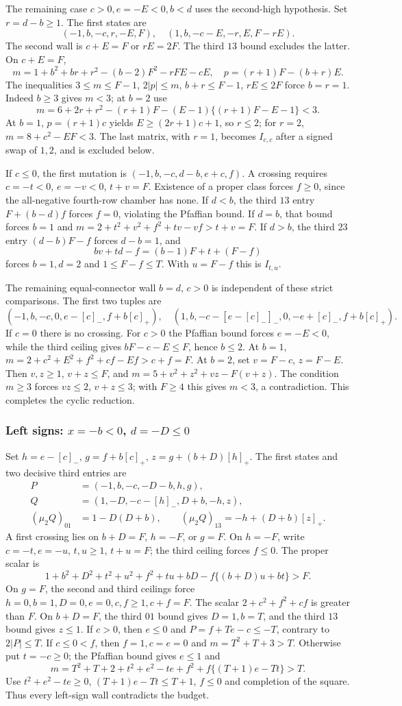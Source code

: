 The remaining case $c>0,e=-E<0,b<d$ uses the second-high hypothesis. Set $r=d-b\ge1$. The first states are
\[
 (-1,b,-c,r,-E,F),\quad(1,b,-c-E,-r,E,F-rE).
\]
The second wall is $c+E=F$ or $rE=2F$. The third $13$ bound excludes the latter. On $c+E=F$,
\[
 m=1+b^2+br+r^2-(b-2)F^2-rFE-cE,\quad p=(r+1)F-(b+r)E.
\]
The inequalities $3\le m\le F-1$, $2|p|\le m$, $b+r\le F-1$, $rE\le2F$ force $b=r=1$. Indeed $b\ge3$ gives $m<3$; at $b=2$ use
\[
 m=6+2r+r^2-(r+1)F-(E-1)\{(r+1)F-E-1\}<3.
\]
At $b=1$, $p=(r+1)c$ yields $E\ge(2r+1)c+1$, so $r\le2$; for $r=2$, $m=8+c^2-EF<3$. The last matrix, with $r=1$, becomes $I_{c,c}$ after a signed swap of $1,2$, and is excluded below.

If $c\le0$, the first mutation is $(-1,b,-c,d-b,e+c,f)$. A crossing requires $c=-t<0$, $e=-v<0$, $t+v=F$. Existence of a proper class forces $f\ge0$, since the all-negative fourth-row chamber has none. If $d<b$, the third $13$ entry $F+(b-d)f$ forces $f=0$, violating the Pfaffian bound. If $d=b$, that bound forces $b=1$ and
$m=2+t^2+v^2+f^2+tv-vf>t+v=F$.
If $d>b$, the third $23$ entry $(d-b)F-f$ forces $d-b=1$, and
\[
 bv+td-f=(b-1)F+t+(F-f)
\]
forces $b=1,d=2$ and $1\le F-f\le T$. With $u=F-f$ this is $I_{t,u}$.

The remaining equal-connector wall $b=d$, $c>0$ is independent of these strict comparisons. The first two tuples are
\[
 (-1,b,-c,0,e-[c]_-,f+b[c]_+),\quad
 (1,b,-c-[e-[c]_-]_-,0,-e+[c]_-,f+b[c]_+).
\]
If $c=0$ there is no crossing. For $c>0$ the Pfaffian bound forces $e=-E<0$, while the third ceiling gives $bF-c-E\le F$, hence $b\le2$. At $b=1$,
$m=2+c^2+E^2+f^2+cf-Ef>c+f=F$.
At $b=2$, set $v=F-c$, $z=F-E$. Then $v,z\ge1$, $v+z\le F$, and
$m=5+v^2+z^2+vz-F(v+z)$. The condition $m\ge3$ forces $vz\le2$, $v+z\le3$; with $F\ge4$ this gives $m<3$, a contradiction. This completes the cyclic reduction.

\subsubsection{Left signs: $x=-b<0$, $d=-D\le0$}
Set $h=e-[c]_-$, $g=f+b[c]_+$, $z=g+(b+D)[h]_+$. The first states and two decisive third entries are
\begin{align*}
 P&=(-1,b,-c,-D-b,h,g),\\
 Q&=(1,-D,-c-[h]_-,D+b,-h,z),\\
 (\mu_2Q)_{01}&=1-D(D+b),\qquad
 (\mu_2Q)_{13}=-h+(D+b)[z]_+.
\end{align*}
A first crossing lies on $b+D=F$, $h=-F$, or $g=F$.
On $h=-F$, write $c=-t,e=-u$, $t,u\ge1$, $t+u=F$; the third ceiling forces $f\le0$. The proper scalar is
\[
 1+b^2+D^2+t^2+u^2+f^2+tu+bD-f\{(b+D)u+bt\}>F.
\]
On $g=F$, the second and third ceilings force $h=0,b=1,D=0,e=0,c,f\ge1,c+f=F$. The scalar $2+c^2+f^2+cf$ is greater than $F$.
On $b+D=F$, the third $01$ bound gives $D=1,b=T$, and the third $13$ bound gives $z\le1$. If $c>0$, then $e\le0$ and $P=f+Te-c\le-T$, contrary to $2|P|\le T$. If $c\le0<f$, then $f=1,c=e=0$ and $m=T^2+T+3>T$. Otherwise put $t=-c\ge0$; the Pfaffian bound gives $e\le1$ and
\[
 m=T^2+T+2+t^2+e^2-te+f^2+f\{(T+1)e-Tt\}>T.
\]
Use $t^2+e^2-te\ge0$, $(T+1)e-Tt\le T+1$, $f\le0$ and completion of the square. Thus every left-sign wall contradicts the budget.


